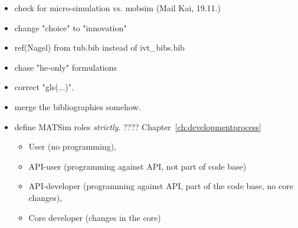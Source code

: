 \begin{itemize}

\item check for micro-simulation vs. mobsim (Mail Kai, 19.11.)

\item change "choice" to "innovation"

\item ref(Nagel) from tub.bib instead of ivt\_bibs.bib

\item chase "he-only" formulations

\item correct "gls(...)".

\item merge the bibliographies somehow.

\item define MATSim roles \emph{strictly}. ???? Chapter~\ref{ch:developmentprocess}
\begin{itemize}
\item User (no programming), 
\item API-user (programming against API, not part of code base) 
\item API-developer (programming against API, part of the code base, no core changes), 
\item Core developer (changes in the core)
\end{itemize}

\end{itemize}

\vfill\eject

\lstset{language=Java}


\createtitlepage
{}

 \cleardoublepage

{\parskip0pt %
\tableofcontents \cleardoublepage
}


